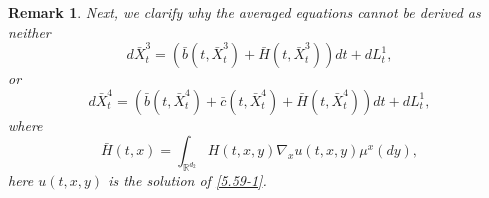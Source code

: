 \documentclass[11pt,reqno]{amsart}
\newtheorem{remark}{\indent Remark}[section]
\numberwithin{equation}{section}
\begin{document}
\begin{remark}\label{R51}
	Next, we clarify why the averaged equations cannot be derived as neither
	\begin{equation}\label{5.R3}
		d\bar{X}^{3}_{t}=(\bar{b}(t,\bar{X}^{3}_{t})+\bar{H}(t,\bar{X}^{3}_{t}))dt+dL_{t}^{1},
	\end{equation}
	or
		\begin{equation}\label{5.R4}
		d\bar{X}^{4}_{t}=(\bar{b}(t,\bar{X}^{4}_{t})+\bar{c}(t,\bar{X}^{4}_{t})+\bar{H}(t,\bar{X}^{4}_{t}))dt+dL_{t}^{1},
	\end{equation}
	where \begin{equation}
		\bar{H}(t,x)=\int_{\mathbb{R}^{ d_{2}}}H(t,x,y)\nabla_{x}u(t,x,y)\mu^{x}(dy),
		\nonumber
	\end{equation}
	here $u(t,x,y)$ is the solution of \eqref{5.59-1}. 
	

\end{remark}
\end{document}
